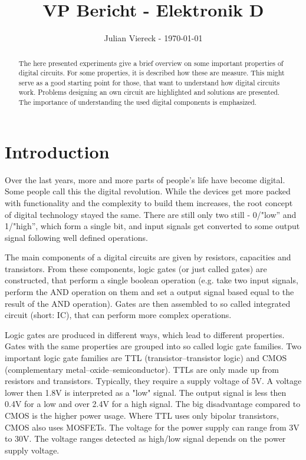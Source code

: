 \documentclass[journal]{IEEEtran}
\title{VP Bericht - Elektronik D}
\author{Julian Viereck - \today}
\begin{document}
\maketitle

\begin{abstract}The here presented experiments give a brief overview on some
important properties of digital circuits. For some properties, it is
described how these are measure. This might serve as a good starting point for
those, that want to understand how digital circuits work.
Problems designing an own circuit are highlighted and solutions are presented.
The importance of understanding the used digital components is emphasized.    
\end{abstract}

\tableofcontents

\section{Introduction}

Over the last years, more and more parts of people's life have become digital.
Some people call this the digital revolution. While the devices get more
packed with functionality and the complexity to build them increases, the root
concept of digital technology stayed the same. There are still only two 
still - 0/"low'' and 1/"high'', which form a single bit, and input signals get
converted to some output signal following well defined operations.

The main components of a digital circuits are given by resistors, capacities and
transistors. From these components, logic gates (or just called gates) are
constructed, that perform a single boolean operation
(e.g.
take two input signals, perform the AND operation on them and set a output
signal based equal to the result of the AND operation). Gates are then
assembled to so called integrated circuit (short: IC), that can perform more
complex operations.

Logic gates are produced in different ways, which lead to different properties.
Gates with the same properties are grouped into so called logic gate families.
Two important logic gate families are TTL (transistor–transistor logic) and CMOS
(complementary metal–oxide–semiconductor). TTLs are only made up from resistors and
transistors. Typically, they require a supply voltage of 5V. A voltage lower
then 1.8V is interpreted as a "low" signal. The output signal is less then 0.4V
for a low and over 2.4V for a high signal. The big disadvantage compared
to CMOS is the higher power usage. Where TTL uses only bipolar transistors, CMOS also uses
MOSFETs. The voltage for the power supply can range from 3V to 30V. The voltage
ranges detected as high/low signal depends on the power supply voltage.
\end{document}
